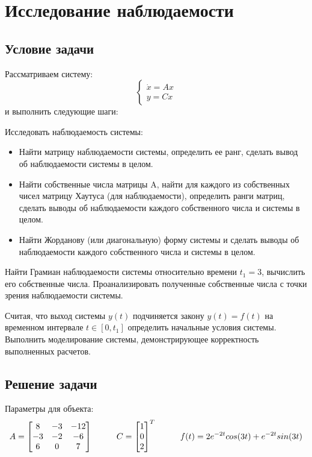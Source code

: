 \chapter{Исследование наблюдаемости}
\label{ch:chap3}
\section{Условие задачи}

Рассматриваем систему:
$$
  \begin{cases}
    \dot{x} = Ax \\
    y = Cx
  \end{cases}
$$ и выполнить следующие шаги:


    Исследовать наблюдаемость системы:
      \begin{itemize}
        \item Найти матрицу наблюдаемости системы, определить ее ранг, сделать вывод об наблюдаемости системы в целом.
        \item Найти собственные числа матрицы A, найти для каждого из собственных чисел матрицу Хаутуса 
        (для наблюдаемости), определить ранги матриц, сделать
         выводы об наблюдаемости каждого собственного числа и системы в целом.
         \item Найти Жорданову (или диагональную) форму системы и сделать выводы об
         наблюдаемости каждого собственного числа и системы в целом.
      \end{itemize}
      
      Найти Грамиан наблюдаемости системы относительно времени $t_1 = 3$, вычислить
      его собственные числа. Проанализировать полученные собственные числа с точки
      зрения наблюдаемости системы.

      Считая, что выход системы $y(t)$ подчиняется закону $y(t) = f(t)$ на временном
      интервале $t\in[0,t_1]$ определить начальные условия системы. Выполнить моделирование системы, 
      демонстрирующее корректность выполненных расчетов.
    

\section{Решение задачи}

Параметры для объекта:
$$
  A = \begin{bmatrix}
    8   &	-3	&  -12 \\
    -3   &   -2  &  -6 \\
    6  &    0  &  7
  \end{bmatrix} \hspace*{1cm}
  C = \begin{bmatrix}
    1\\0\\2 
  \end{bmatrix}^T \hspace*{1cm}
  f(t) = 2e^{-2t}cos(3t) + e^{-2t}sin(3t)
$$



